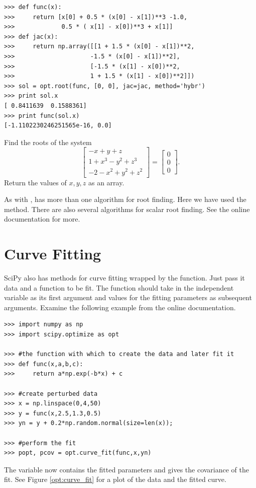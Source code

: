 \begin{lstlisting}
>>> def func(x):
>>>     return [x[0] + 0.5 * (x[0] - x[1])**3 -1.0,
>>>             0.5 * ( x[1] - x[0])**3 + x[1]]
>>> def jac(x):
>>>     return np.array([[1 + 1.5 * (x[0] - x[1])**2,
>>>                     -1.5 * (x[0] - x[1])**2],
>>>                     [-1.5 * (x[1] - x[0])**2,
>>>                     1 + 1.5 * (x[1] - x[0])**2]])
>>> sol = opt.root(func, [0, 0], jac=jac, method='hybr')
>>> print sol.x
[ 0.8411639  0.1588361]
>>> print func(sol.x)
[-1.1102230246251565e-16, 0.0]
\end{lstlisting}

\begin{problem}
Find the roots of the system
\[
\begin{bmatrix}
	-x+y+z \\
	1+x^3-y^2+z^3\\
	-2-x^2+y^2+z^2
\end{bmatrix} =
\begin{bmatrix}
	0 \\
	0 \\
	0
\end{bmatrix} .
\]
Return the values of $x,y,z$ as an array.
\end{problem}

As with ,  has more than one algorithm for root finding.
Here we have used the  method. 
There are also several algorithms for scalar root finding. See the online documentation for more.

\section*{Curve Fitting} %


SciPy also has methods for curve fitting wrapped by the  function.
Just pass it data and a function to be fit. 
The function should take in the independent variable as its first argument and values for the fitting parameters as subsequent arguments.
Examine the following example from the online documentation.
\begin{lstlisting}
>>> import numpy as np
>>> import scipy.optimize as opt

>>> #the function with which to create the data and later fit it
>>> def func(x,a,b,c):
>>>     return a*np.exp(-b*x) + c

>>> #create perturbed data
>>> x = np.linspace(0,4,50)
>>> y = func(x,2.5,1.3,0.5)
>>> yn = y + 0.2*np.random.normal(size=len(x));

>>> #perform the fit
>>> popt, pcov = opt.curve_fit(func,x,yn)
\end{lstlisting}
The variable  now contains the fitted parameters and  gives the covariance of the fit.
See Figure \ref{opt:curve_fit} for a plot of the data and the fitted curve.

